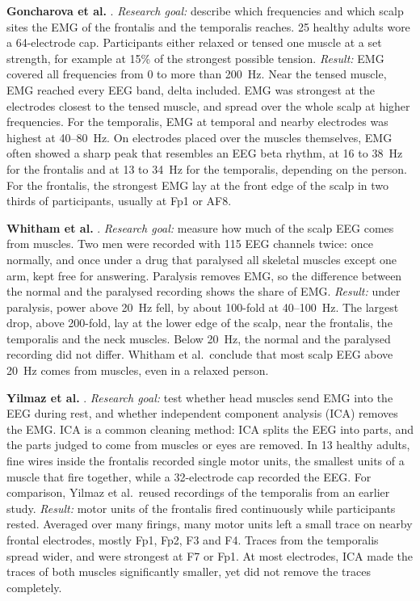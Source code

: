 \documentclass[12pt,a4paper]{report}
\begin{document}
\textbf{Goncharova et al.} \cite{goncharova_emg_2003}. \emph{Research goal:} describe which frequencies and which scalp sites the EMG of the frontalis and the temporalis reaches. 25 healthy adults wore a 64-electrode cap. Participants either relaxed or tensed one muscle at a set strength, for example at 15\% of the strongest possible tension. \emph{Result:} EMG covered all frequencies from 0 to more than 200~Hz. Near the tensed muscle, EMG reached every EEG band, delta included. EMG was strongest at the electrodes closest to the tensed muscle, and spread over the whole scalp at higher frequencies. For the temporalis, EMG at temporal and nearby electrodes was highest at 40--80~Hz. On electrodes placed over the muscles themselves, EMG often showed a sharp peak that resembles an EEG beta rhythm, at 16 to 38~Hz for the frontalis and at 13 to 34~Hz for the temporalis, depending on the person. For the frontalis, the strongest EMG lay at the front edge of the scalp in two thirds of participants, usually at Fp1 or AF8.

\textbf{Whitham et al.} \cite{whitham_scalp_2007}. \emph{Research goal:} measure how much of the scalp EEG comes from muscles. Two men were recorded with 115 EEG channels twice: once normally, and once under a drug that paralysed all skeletal muscles except one arm, kept free for answering. Paralysis removes EMG, so the difference between the normal and the paralysed recording shows the share of EMG. \emph{Result:} under paralysis, power above 20~Hz fell, by about 100-fold at 40--100~Hz. The largest drop, above 200-fold, lay at the lower edge of the scalp, near the frontalis, the temporalis and the neck muscles. Below 20~Hz, the normal and the paralysed recording did not differ. Whitham et al.\ conclude that most scalp EEG above 20~Hz comes from muscles, even in a relaxed person.

\textbf{Yilmaz et al.} \cite{yilmaz_facial_2019}. \emph{Research goal:} test whether head muscles send EMG into the EEG during rest, and whether independent component analysis (ICA) removes the EMG. ICA is a common cleaning method: ICA splits the EEG into parts, and the parts judged to come from muscles or eyes are removed. In 13 healthy adults, fine wires inside the frontalis recorded single motor units, the smallest units of a muscle that fire together, while a 32-electrode cap recorded the EEG. For comparison, Yilmaz et al.\ reused recordings of the temporalis from an earlier study. \emph{Result:} motor units of the frontalis fired continuously while participants rested. Averaged over many firings, many motor units left a small trace on nearby frontal electrodes, mostly Fp1, Fp2, F3 and F4. Traces from the temporalis spread wider, and were strongest at F7 or Fp1. At most electrodes, ICA made the traces of both muscles significantly smaller, yet did not remove the traces completely.
\end{document}
